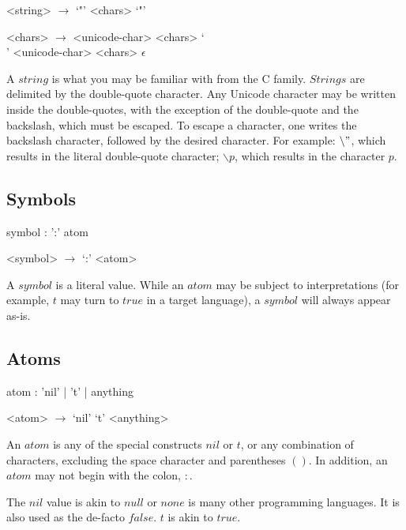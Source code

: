 \documentclass[a4paper]{article}
\begin{document}
\begin{grammar}
	<string> $\to$ `"' <chars> `"'

	<chars> $\to$ <unicode-char> <chars>
		\alt `\\' <unicode-char> <chars>
		\alt $\epsilon$
\end{grammar}

A $string$ is what you may be familiar with from the C family. $Strings$ are delimited by the double-quote character. Any Unicode character may be written inside the double-quotes, with the exception of the double-quote and the backslash, which must be escaped. To escape a character, one writes the backslash character, followed by the desired character. For example: $\backslash "$, which results in the literal double-quote character; $\backslash p$, which results in the character $p$.

\subsection{Symbols}
\begin{rail}
	symbol : ':' atom
\end{rail}

\begin{grammar}
	<symbol> $\to$ `:' <atom>
\end{grammar}

A $symbol$ is a literal value. While an $atom$ may be subject to interpretations (for example, $t$ may turn to $true$ in a target language), a $symbol$ will always appear as-is.

\subsection{Atoms}
\begin{rail}
	atom : 'nil' | 't' | anything
\end{rail}

\begin{grammar}
	<atom> $\to$ `nil'
		\alt `t'
		\alt <anything>
\end{grammar}

An $atom$ is any of the special constructs $nil$ or $t$, or any combination of characters, excluding the space character and parentheses $()$. In addition, an $atom$ may not begin with the colon, $:$.

The $nil$ value is akin to $null$ or $none$ is many other programming languages. It is also used as the de-facto $false$. $t$ is akin to $true$.
\end{document}
